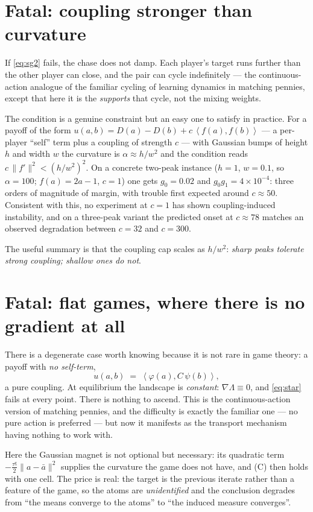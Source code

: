 \documentclass[11pt]{article}
\theoremstyle{definition}
\newcommand{\ip}[2]{\left\langle #1, #2 \right\rangle}
\begin{document}
\section{Fatal: coupling stronger than curvature}

If \eqref{eq:sg2} fails, the chase does not damp. Each player's target runs
further than the other player can close, and the pair can cycle indefinitely ---
the continuous-action analogue of the familiar cycling of learning dynamics in
matching pennies, except that here it is the \emph{supports} that cycle, not the
mixing weights.

The condition is a genuine constraint but an easy one to satisfy in practice. For
a payoff of the form
$u(a,b) = D(a) - D(b) + c\,\ip{f(a)}{f(b)}$ --- a per-player ``self'' term plus a
coupling of strength $c$ --- with Gaussian bumps of height $h$ and width $w$ the
curvature is $\alpha \approx h/w^2$ and the condition reads
$c\,\|f'\|^2 < (h/w^2)^2$. On a concrete two-peak instance
($h=1$, $w=0.1$, so $\alpha = 100$; $f(a) = 2a-1$, $c = 1$) one gets
$g_0 = 0.02$ and $g_0 g_1 = 4\times10^{-4}$: three orders of magnitude of margin,
with trouble first expected around $c \approx 50$. Consistent with this, no
experiment at $c=1$ has shown coupling-induced instability, and on a three-peak
variant the predicted onset at $c \approx 78$ matches an observed degradation
between $c=32$ and $c=300$.

The useful summary is that the coupling cap scales as $h/w^2$: \emph{sharp peaks
tolerate strong coupling; shallow ones do not}.

\section{Fatal: flat games, where there is no gradient at all}

There is a degenerate case worth knowing because it is not rare in game theory:
a payoff with \emph{no self-term},
\[
  u(a,b) \;=\; \ip{\varphi(a)}{C\,\psi(b)} ,
\]
a pure coupling. At equilibrium the landscape is \emph{constant}:
$\nabla\Lambda \equiv 0$, and \eqref{eq:star} fails at every point. There is
nothing to ascend. This is the continuous-action version of matching pennies, and
the difficulty is exactly the familiar one --- no pure action is preferred --- but
now it manifests as the transport mechanism having nothing to work with.

Here the Gaussian magnet is not optional but necessary: its quadratic term
$-\tfrac{\tau^{\mathrm g}}{2}\|a - \bar a\|^2$ supplies the curvature the game
does not have, and (C) then holds with one cell. The price is real: the target is
the previous iterate rather than a feature of the game, so the atoms are
\emph{unidentified} and the conclusion degrades from ``the means converge to the
atoms'' to ``the induced measure converges''.
\end{document}
